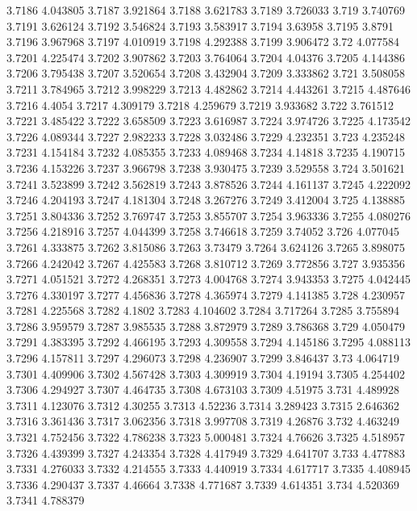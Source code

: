 3.7186  4.043805
3.7187  3.921864
3.7188  3.621783
3.7189  3.726033
3.719  3.740769
3.7191  3.626124
3.7192  3.546824
3.7193  3.583917
3.7194  3.63958
3.7195  3.8791
3.7196  3.967968
3.7197  4.010919
3.7198  4.292388
3.7199  3.906472
3.72  4.077584
3.7201  4.225474
3.7202  3.907862
3.7203  3.764064
3.7204  4.04376
3.7205  4.144386
3.7206  3.795438
3.7207  3.520654
3.7208  3.432904
3.7209  3.333862
3.721  3.508058
3.7211  3.784965
3.7212  3.998229
3.7213  4.482862
3.7214  4.443261
3.7215  4.487646
3.7216  4.4054
3.7217  4.309179
3.7218  4.259679
3.7219  3.933682
3.722  3.761512
3.7221  3.485422
3.7222  3.658509
3.7223  3.616987
3.7224  3.974726
3.7225  4.173542
3.7226  4.089344
3.7227  2.982233
3.7228  3.032486
3.7229  4.232351
3.723  4.235248
3.7231  4.154184
3.7232  4.085355
3.7233  4.089468
3.7234  4.14818
3.7235  4.190715
3.7236  4.153226
3.7237  3.966798
3.7238  3.930475
3.7239  3.529558
3.724  3.501621
3.7241  3.523899
3.7242  3.562819
3.7243  3.878526
3.7244  4.161137
3.7245  4.222092
3.7246  4.204193
3.7247  4.181304
3.7248  3.267276
3.7249  3.412004
3.725  4.138885
3.7251  3.804336
3.7252  3.769747
3.7253  3.855707
3.7254  3.963336
3.7255  4.080276
3.7256  4.218916
3.7257  4.044399
3.7258  3.746618
3.7259  3.74052
3.726  4.077045
3.7261  4.333875
3.7262  3.815086
3.7263  3.73479
3.7264  3.624126
3.7265  3.898075
3.7266  4.242042
3.7267  4.425583
3.7268  3.810712
3.7269  3.772856
3.727  3.935356
3.7271  4.051521
3.7272  4.268351
3.7273  4.004768
3.7274  3.943353
3.7275  4.042445
3.7276  4.330197
3.7277  4.456836
3.7278  4.365974
3.7279  4.141385
3.728  4.230957
3.7281  4.225568
3.7282  4.1802
3.7283  4.104602
3.7284  3.717264
3.7285  3.755894
3.7286  3.959579
3.7287  3.985535
3.7288  3.872979
3.7289  3.786368
3.729  4.050479
3.7291  4.383395
3.7292  4.466195
3.7293  4.309558
3.7294  4.145186
3.7295  4.088113
3.7296  4.157811
3.7297  4.296073
3.7298  4.236907
3.7299  3.846437
3.73  4.064719
3.7301  4.409906
3.7302  4.567428
3.7303  4.309919
3.7304  4.19194
3.7305  4.254402
3.7306  4.294927
3.7307  4.464735
3.7308  4.673103
3.7309  4.51975
3.731  4.489928
3.7311  4.123076
3.7312  4.30255
3.7313  4.52236
3.7314  3.289423
3.7315  2.646362
3.7316  3.361436
3.7317  3.062356
3.7318  3.997708
3.7319  4.26876
3.732  4.463249
3.7321  4.752456
3.7322  4.786238
3.7323  5.000481
3.7324  4.76626
3.7325  4.518957
3.7326  4.439399
3.7327  4.243354
3.7328  4.417949
3.7329  4.641707
3.733  4.477883
3.7331  4.276033
3.7332  4.214555
3.7333  4.440919
3.7334  4.617717
3.7335  4.408945
3.7336  4.290437
3.7337  4.46664
3.7338  4.771687
3.7339  4.614351
3.734  4.520369
3.7341  4.788379
